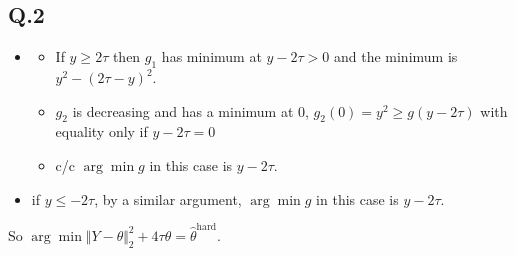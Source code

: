 \documentclass[12pt]{article}\usepackage[]{graphicx}\usepackage[]{color}
\newcommand{\Q}[1]{\subsection*{Q.#1}}
\newenvironment{question}[1]
{\Q{#1}}{}
\begin{document}
\begin{question}{2}
\begin{itemize}
\begin{itemize}
  \item
    \begin{itemize}
    \item If $y \ge 2\tau$ then $g_1$ has minimum at $y - 2\tau > 0$  and the minimum is $ y^2 - (2\tau-y)^2$.
    \item   $g_2$ is decreasing  and has a minimum at 0, $g_2(0) = y^2 \ge g(y-2\tau)$ with equality only if $y-2\tau = 0$
    \item c/c  $\arg\min g$ in this case is $y - 2\tau$.
    \end{itemize}

  \item if $y \le -2\tau$, by a similar argument, $\arg\min g$ in this
    case is $y - 2\tau$.
  \end{itemize}
  
  So
  $\arg\min \Vert Y - \theta\Vert _2^2 + 4\tau \theta = \hat
  \theta^{\text{hard}}$.
\end{itemize}
\end{question}
\end{document}
